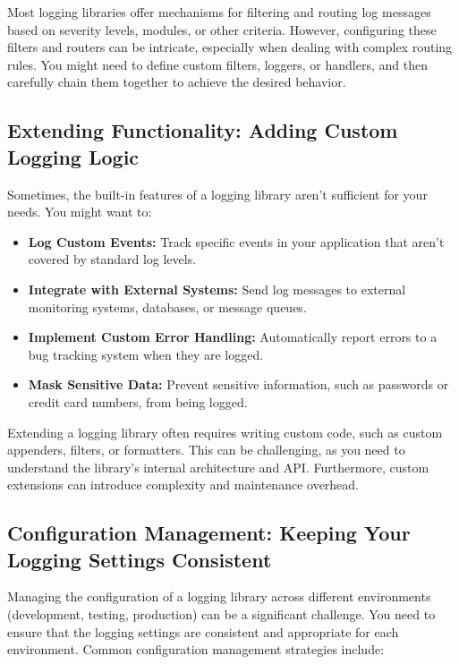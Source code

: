 \documentclass{article}
\begin{document}
{{{{Most logging libraries offer mechanisms for filtering and routing log messages based on severity levels, modules, or other criteria. However, configuring these filters and routers can be intricate, especially when dealing with complex routing rules. You might need to define custom filters, loggers, or handlers, and then carefully chain them together to achieve the desired behavior.

\subsection*{Extending Functionality: Adding Custom Logging Logic}

Sometimes, the built-in features of a logging library aren't sufficient for your needs. You might want to:

\begin{itemize}
    \item \textbf{Log Custom Events:} Track specific events in your application that aren't covered by standard log levels.
    \item \textbf{Integrate with External Systems:} Send log messages to external monitoring systems, databases, or message queues.
    \item \textbf{Implement Custom Error Handling:} Automatically report errors to a bug tracking system when they are logged.
    \item \textbf{Mask Sensitive Data:} Prevent sensitive information, such as passwords or credit card numbers, from being logged.
\end{itemize}

Extending a logging library often requires writing custom code, such as custom appenders, filters, or formatters. This can be challenging, as you need to understand the library's internal architecture and API. Furthermore, custom extensions can introduce complexity and maintenance overhead.

\subsection*{Configuration Management: Keeping Your Logging Settings Consistent}

Managing the configuration of a logging library across different environments (development, testing, production) can be a significant challenge. You need to ensure that the logging settings are consistent and appropriate for each environment. Common configuration management strategies include:

}}}}
\end{document}

